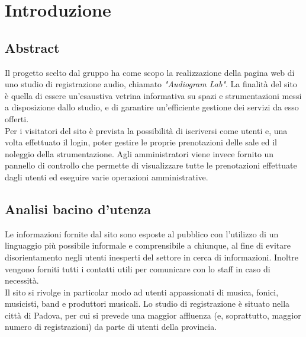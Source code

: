 \section{Introduzione}

\vspace{8px}

\subsection{Abstract}
Il progetto scelto dal gruppo ha come scopo la realizzazione della pagina web di uno studio di registrazione audio, chiamato \emph{"Audiogram Lab"}. La finalità del sito è quella di essere un'esaustiva vetrina informativa su spazi e strumentazioni messi a disposizione dallo studio, e di garantire un'efficiente gestione dei servizi da esso offerti.\\
Per i visitatori del sito è prevista la possibilità di iscriversi come utenti e, una volta effettuato il login, poter gestire le proprie prenotazioni delle sale ed il noleggio della strumentazione. Agli amministratori viene invece fornito un pannello di controllo che permette di visualizzare tutte le prenotazioni effettuate dagli utenti ed eseguire varie operazioni amministrative.

\vspace{8px}

\subsection{Analisi bacino d'utenza}
Le informazioni fornite dal sito sono esposte al pubblico con l'utilizzo di un linguaggio più possibile informale e comprensibile a chiunque, al fine di evitare disorientamento negli utenti inesperti del settore in cerca di informazioni. Inoltre vengono forniti tutti i contatti utili per comunicare con lo staff in caso di necessità.\\
Il sito si rivolge in particolar modo ad utenti appassionati di musica, fonici, musicisti, band e produttori musicali. Lo studio di registrazione è situato nella città di Padova, per cui si prevede una maggior affluenza (e, soprattutto, maggior numero di registrazioni) da parte di utenti della provincia.
